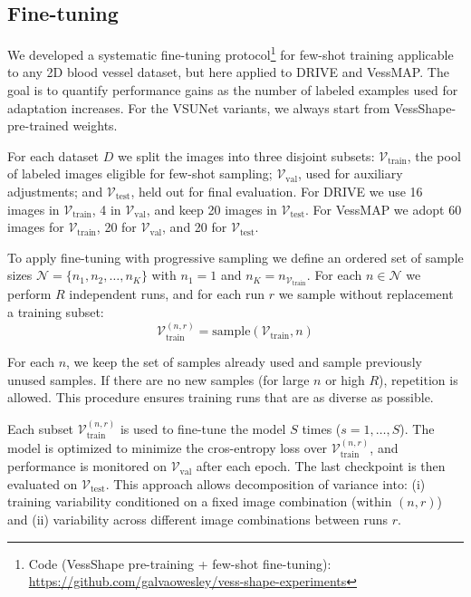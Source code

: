 \documentclass[%
reprint,
nofootinbib,
 amsmath,amssymb,
aps,
superscriptaddress,
showkeys,
longbibliography
]{revtex4-1}
\begin{document}
\subsection{Fine-tuning}

We developed a systematic fine-tuning protocol\footnote{Code (VessShape pre-training + few-shot fine-tuning): \url{https://github.com/galvaowesley/vess-shape-experiments} } for few-shot training applicable to any 2D blood vessel dataset, but here applied to DRIVE and VessMAP. The goal is to quantify performance gains as the number of labeled examples used for adaptation increases. For the VSUNet variants, we always start from VessShape-pre-trained weights.

For each dataset $D$ we split the images into three disjoint subsets: $\mathcal{V}_{\text{train}}$, the pool of labeled images eligible for few-shot sampling; $\mathcal{V}_{\text{val}}$, used for auxiliary adjustments; and $\mathcal{V}_{\text{test}}$, held out for final evaluation. For DRIVE we use 16 images in $\mathcal{V}_{\text{train}}$, 4 in $\mathcal{V}_{\text{val}}$, and keep 20 images in $\mathcal{V}_{\text{test}}$. For VessMAP we adopt 60 images for $\mathcal{V}_{\text{train}}$, 20 for $\mathcal{V}_{\text{val}}$, and 20 for $\mathcal{V}_{\text{test}}$.

To apply fine-tuning with progressive sampling we define an ordered set of sample sizes $\mathcal{N} = \{ n_1, n_2, \ldots, n_K \}$ with $n_1 = 1$ and $n_K = n_{\mathcal{V}_{\text{train}}}$. For each $n \in \mathcal{N}$ we perform $R$ independent runs, and for each run $r$ we sample without replacement a training subset:
\[
\mathcal{V}^{(n,r)}_{\text{train}} = \text{sample}(\mathcal{V}_{\text{train}}, n)
\]

For each $n$, we keep the set of samples already used and sample previously unused samples. If there are no new samples (for large $n$ or high $R$), repetition is allowed. This procedure ensures training runs that are as diverse as possible.

Each subset $\mathcal{V}^{(n,r)}_{\text{train}}$ is used to fine-tune the model $S$ times ($s=1,\ldots,S$). The model is optimized to minimize the cros-entropy loss over $\mathcal{V}^{(n,r)}_{\text{train}}$, and performance is monitored on $\mathcal{V}_{\text{val}}$ after each epoch. The last checkpoint is then evaluated on $\mathcal{V}_{\text{test}}$. This approach allows decomposition of variance into: (i) training variability conditioned on a fixed image combination (within $(n,r)$) and (ii) variability across different image combinations between runs $r$.
\end{document}
